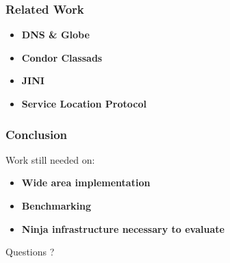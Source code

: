 \documentclass{beamer}
\begin{document}
\begin{frame}[fragile] %
\frametitle{Related Work}
\begin{itemize}
\item {\bf DNS \& Globe}
\item {\bf Condor Classads}
\item {\bf JINI}
\item {\bf Service Location Protocol}
\end{itemize}
\end{frame}


\begin{frame}[fragile] %
\frametitle{Conclusion}
Work still needed on: 
\begin{itemize}
\item {\bf Wide area implementation }
\item {\bf Benchmarking }
\item {\bf Ninja infrastructure necessary to evaluate}
\end{itemize}
\end{frame}


\begin{frame}
\Huge{\centerline{Questions ?}}
\end{frame}

\end{document}
